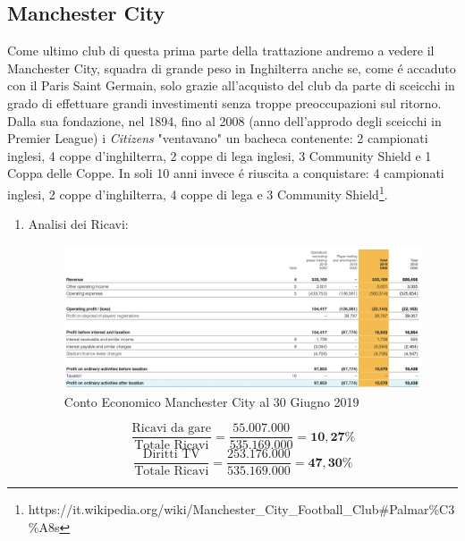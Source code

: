 \documentclass[
    corpo=12pt,
    oneside,
    evenboxes,
    tipotesi=triennale,
    stile=classica,
    oldstyle,
    autoretitolo,
    greek,
]{toptesi}
\begin{document}
\begin{interlinea}{1.5}
\subsection{Manchester City}
Come ultimo club di questa prima parte della trattazione andremo a vedere il Manchester City, squadra di grande peso in Inghilterra anche se,
come \'e accaduto con il Paris Saint Germain, solo grazie all'acquisto del club da parte di sceicchi in grado di effettuare grandi investimenti 
senza troppe preoccupazioni sul ritorno. Dalla sua fondazione, nel 1894, fino al 2008 (anno dell'approdo degli sceicchi in Premier League) i \emph{Citizens} "ventavano"
un bacheca contenente: 2 campionati inglesi, 4 coppe d'inghilterra, 2 coppe di lega inglesi, 3 Community Shield e 1 Coppa delle Coppe. 
In soli 10 anni invece \'e riuscita a conquistare: 4 campionati inglesi, 2 coppe d'inghilterra, 4 coppe di lega e 3 Community Shield\footnote{https://it.wikipedia.org/wiki/Manchester\_City\_Football\_Club\#Palmar\%C3\%A8s}.\newpage
\begin{enumerate}
    \item Analisi dei Ricavi:\newline
        \begin{figure}
            \centering
            \includegraphics[scale=.4]{img/CE_city.png}
            \caption{Conto Economico Manchester City al 30 Giugno 2019}
            \label{ce_city}
        \end{figure}\newline
        \begin{equation}
            \frac{\text{Ricavi da gare}}{\text{Totale Ricavi}} = \frac{55.007.000}{535.169.000} = \mathbf{10,27\%}
            \label{eqn: gare_city}
        \end{equation}
        \begin{equation}
            \frac{\text{Diritti TV}}{\text{Totale Ricavi}} = \frac{253.176.000}{535.169.000} = \mathbf{47,30\%}
            \label{eqn: tv_city}
        \end{equation}

\end{enumerate}
\end{interlinea}
\end{document}
